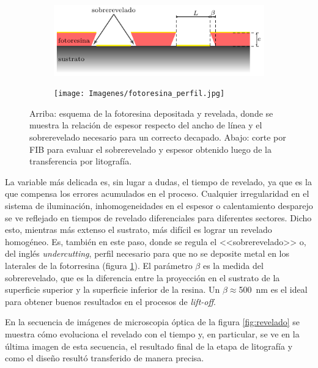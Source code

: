 {					%
 				\begin{figure}[hb!]
 				\centering
 				\begin{subfigure}[t]{0.75\textwidth}
 				\hspace{0.46cm}\includegraphics[width=\textwidth]{Esquemas/altura-ancho.pdf}
 				\end{subfigure}
 				\begin{subfigure}[t]{0.65\textwidth}
 				\texttt{[image: Imagenes/fotoresina\_perfil.jpg]}
 				\end{subfigure}
 				\caption[Perfil de fotorresina para el decapado o\textit{ lift-off}]{Arriba: esquema de la fotoresina depositada y revelada, donde se muestra la relación de espesor respecto del ancho de línea y el sobrerevelado necesario para un correcto decapado. Abajo: corte por FIB para evaluar el sobrerevelado y espesor obtenido luego de la transferencia por litografía.}
 				\label{fig:undercut}
 				\end{figure}

 	   		 La variable más delicada es, sin lugar a dudas, el tiempo de revelado, ya que es la que compensa los errores acumulados en el proceso. Cualquier irregularidad en el sistema de iluminación, inhomogeneidades en el espesor o calentamiento desparejo se ve reflejado en tiempos de revelado diferenciales para diferentes sectores. Dicho esto, mientras más extenso el sustrato, más difícil es lograr un revelado homogéneo. Es, también en este paso, donde se regula el <<sobrerevelado>> o, del inglés \textit{undercutting}, perfil necesario para que no se deposite metal en los laterales de la fotorresina (figura \ref{fig:undercut}). El parámetro $\beta$ es la medida del sobrerevelado, que es la diferencia entre la proyección en el sustrato de la superficie superior y la superficie inferior de la resina. Un $\beta\!\!\approx$\SI{500}{\nm} es el ideal para obtener buenos resultados en el procesos de \textit{lift-off}. 
 
 	         En la secuencia de imágenes de microscopia óptica de la figura \ref{fig:revelado} se muestra cómo evoluciona el revelado con el tiempo y, en particular, se ve en la última imagen de esta secuencia, el resultado final de la etapa de litografía y como el diseño resultó transferido de manera precisa.

}

